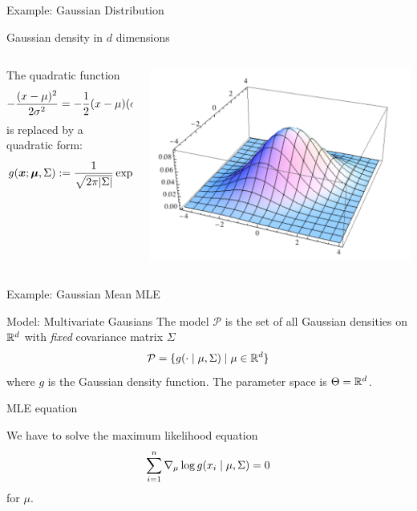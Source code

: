 \documentclass[10pt]{beamer}
\newcommand{\bp}[1]{\bigg(  {#1} \bigg)}
\begin{document}
\begin{frame}{Example: Gaussian Distribution}
\begin{sblock}{Gaussian density in $d$ dimensions}
\begin{columns}
\begin{column}{.55\textwidth}
\footnotesize
\vfill \vfill \vfill
The quadratic function 
\[ - \displaystyle\frac{(x-\mu)^2}{2 \sigma^2} = -\displaystyle\frac{1}{2} (x-\mu) (\sigma^1)^{-1} (x - \mu) \]
is replaced by a quadratic form:
\[ g(\+x; \+\mu, \Sigma) := \df{1}{\sqrt{2 \pi |\Sigma|}} \exp \bp{ - \df{1}{2} (\+x - \+\mu)^T \Sigma^{-1} ( \+x - \+\mu)} \]
\end{column}
\begin{column}{.3\textwidth}
\includegraphics[width=\textwidth]{images/gaussian_nd}
\end{column}
\end{columns}
\end{sblock}

\end{frame}



\begin{frame}{Example: Gaussian Mean MLE}

\begin{sblock}{Model: Multivariate Gausians}
The model $\mathcal{P}$ is the set of all Gaussian densities on $\mathbb{R}^d$ with \textit{fixed} covariance matrix $\Sigma$
\[ \mathcal{P} = \{ {g(\cdot \; | \; \mu, \Sigma) \; | \; \mu \in \mathbb{R}^d} \} \]
where $g$ is the Gaussian density function.  The parameter space is $\Theta = \mathbb{R}^d$.
\end{sblock}

\begin{sblock}{MLE equation}

We have to solve the maximum likelihood equation 
\[ \displaystyle\sum_{i=1}^n \nabla_\mu \log g(x_i \; | \; \mu, \Sigma) = 0 \]
for $\mu$.
\end{sblock}

\end{frame}
\end{document}
